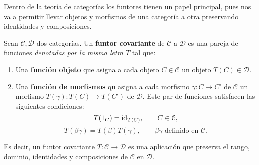 Dentro de la teoría de categorías los funtores tienen un papel principal, pues
nos va a permitir llevar objetos y morfismos de una categoría a otra preservando
identidades y composiciones.

\begin{definicion}
	Sean \(\mathcal{C}, \mathcal{D}\) dos categorías. Un \textbf{funtor covariante} de
	\(\mathcal{C}\) a \(\mathcal{D}\) es una pareja de funciones \textit{denotadas por
	la misma letra \(T\)} tal que:
	\begin{enumerate}
		\item Una \textbf{función objeto} que asigna a cada objeto
			\(C \in \mathcal{C}\) un objeto \(T(C) \in \mathcal{D}\).
		\item Una \textbf{función de morfismos} qu asigna a cada morfismo
			\(\gamma: C \rightarrow C'\) de \(\mathcal{C}\) un morfismo
			\(T(\gamma): T(C) \rightarrow T(C')\) de \(\mathcal{D}\). Este par de funciones
			satisfacen las siguientes condiciones:
			\begin{equation}
				T(1_{C}) = \operatorname{id}_{T(C)}, \qquad C \in \mathcal{C},
			\end{equation}
			\begin{equation}
				T(\beta \gamma) = T(\beta)T(\gamma), \qquad \beta \gamma \text{ definido
				en }\mathcal{C}.
			\end{equation}
	\end{enumerate}
\end{definicion}

Es decir, un funtor covariante \(T: \mathcal{C}\rightarrow \mathcal{D}\) es una
aplicación que preserva el rango, dominio, identidades y composiciones de
\(\mathcal{C}\) en \(\mathcal{D}\).


\endinput
